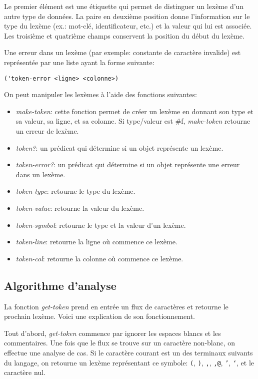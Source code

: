 \documentclass[11pt]{report}
\begin{document}
Le premier élément est une étiquette qui permet de distinguer un
lexème d'un autre type de données.  La paire en deuxième position
donne l'information sur le type du lexème (ex.: mot-clé,
identificateur, etc.) et la valeur qui lui est associée.  Les
troisième et quatrième champs conservent la position du début du
lexème.

Une erreur dans un lexème (par exemple: constante de caractère
invalide) est représentée par une liste ayant la forme suivante:

\begin{verbatim}
('token-error <ligne> <colonne>)
\end{verbatim}


On peut manipuler les lexèmes à l'aide des fonctions suivantes:

\begin{itemize}
\item \emph{make-token}: cette fonction permet de créer un lexème en
  donnant son type et sa valeur, sa ligne, et sa colonne.  Si
  type/valeur est \#f, \emph{make-token} retourne un erreur de lexème.
\item \emph{token?}: un prédicat qui détermine si un objet représente
  un lexème.
\item \emph{token-error?}: un prédicat qui détermine si un objet
  représente une erreur dans un lexème.
\item \emph{token-type}: retourne le type du lexème.
\item \emph{token-value}: retourne la valeur du lexème.
\item \emph{token-symbol}: retourne le type et la valeur d'un lexème.
\item \emph{token-line}: retourne la ligne où commence ce lexème.
\item \emph{token-col}: retourne la colonne où commence ce lexème.
\end{itemize}

\subsection{Algorithme d'analyse}

La fonction \emph{get-token} prend en entrée un flux de caractères et
retourne le prochain lexème.  Voici une explication de son
fonctionnement.

Tout d'abord, \emph{get-token} commence par ignorer les espaces blancs
et les commentaires.  Une fois que le flux se trouve sur un caractère
non-blanc, on effectue une analyse de cas.  Si le caractère courant
est un des terminaux suivants du langage, on retourne un lexème
représentant ce symbole: \texttt{(}, \texttt{)}, \texttt{,},
\texttt{,@}, \texttt{'}, \texttt{`}, et le caractère nul.
\end{document}
